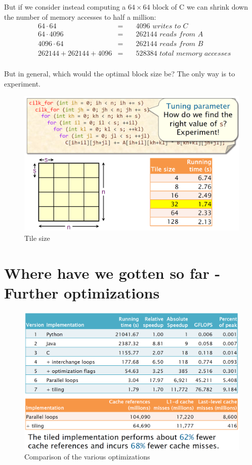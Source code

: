 But if we consider instead computing a $64\times 64$ block of C we can shrink down the number of memory accesses to half a million:
\begin{align}
   & 64 \cdot 64 &=\quad&  4096 \textit{ writes to C}\\
   & 64 \cdot 4096 &=\quad&  262144 \textit{ reads from A}\\
   & 4096 \cdot 64 &=\quad&  262144 \textit{ reads from B}\\
   & 262144 + 262144 + 4096 &=\quad&  528384 \textit{ total memory accesses}\\
\end{align}

But in general, which would the optimal block size be? The only way is to experiment.
\begin{figure}[htbp]
   \centering
   \includegraphics{images/02/tiling_size.png}
   \caption{Tile size}
   \label{fig:02/tiling_size}
\end{figure}
\newpage

\section{Where have we gotten so far - Further optimizations}
\begin{figure}[htbp]
   \centering
   \includegraphics{images/02/comparison.png}
   \caption{Comparison of the various optimizations}
   \label{fig:02/comparison}
\end{figure}

